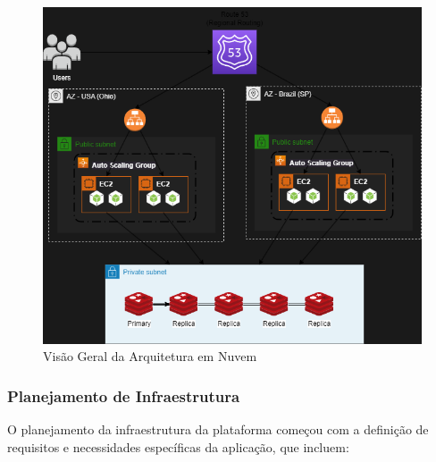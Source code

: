 \begin{figure}[H]
    \centering
    \includegraphics[width=\textwidth]{drawio/cloud-architecture.png}
    \caption{Visão Geral da Arquitetura em Nuvem}
    \label{fig:cloud-architecture}
\end{figure}


\subsubsection{Planejamento de Infraestrutura}

O planejamento da infraestrutura da plataforma começou com a definição de requisitos e necessidades específicas da aplicação, que incluem:

